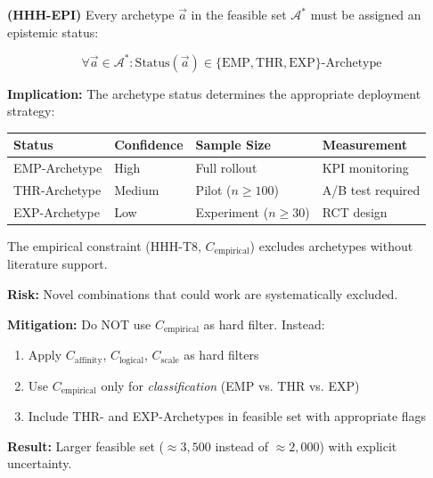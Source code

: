 \begin{tcolorbox}[colback=gray!5!white, colframe=gray!75!black,
    title=\textbf{Axiom HHH-A3: Epistemic Honesty for Archetypes}]

\textbf{(HHH-EPI)} Every archetype $\vec{a}$ in the feasible set $\mathcal{A}^*$ must be assigned an epistemic status:

\begin{equation}
\forall \vec{a} \in \mathcal{A}^* : \text{Status}(\vec{a}) \in \{\text{EMP}, \text{THR}, \text{EXP}\}\text{-Archetype}
\end{equation}

\textbf{Implication:} The archetype status determines the appropriate deployment strategy:

\begin{center}
\renewcommand{\arraystretch}{1.2}
\begin{tabular}{@{}llll@{}}
\toprule
\textbf{Status} & \textbf{Confidence} & \textbf{Sample Size} & \textbf{Measurement} \\
\midrule
EMP-Archetype & High & Full rollout & KPI monitoring \\
THR-Archetype & Medium & Pilot ($n \geq 100$) & A/B test required \\
EXP-Archetype & Low & Experiment ($n \geq 30$) & RCT design \\
\bottomrule
\end{tabular}
\end{center}

\end{tcolorbox}

\begin{tcolorbox}[colback=red!5!white, colframe=red!75!black,
    title=\textbf{Warning: Absence of Evidence $\neq$ Evidence of Absence}]

The empirical constraint (HHH-T8, $C_{\text{empirical}}$) excludes archetypes without literature support.

\textbf{Risk:} Novel combinations that could work are systematically excluded.

\textbf{Mitigation:} Do NOT use $C_{\text{empirical}}$ as hard filter. Instead:
\begin{enumerate}[nosep]
    \item Apply $C_{\text{affinity}}$, $C_{\text{logical}}$, $C_{\text{scale}}$ as hard filters
    \item Use $C_{\text{empirical}}$ only for \textit{classification} (EMP vs. THR vs. EXP)
    \item Include THR- and EXP-Archetypes in feasible set with appropriate flags
\end{enumerate}

\textbf{Result:} Larger feasible set ($\approx 3{,}500$ instead of $\approx 2{,}000$) with explicit uncertainty.

\end{tcolorbox}


